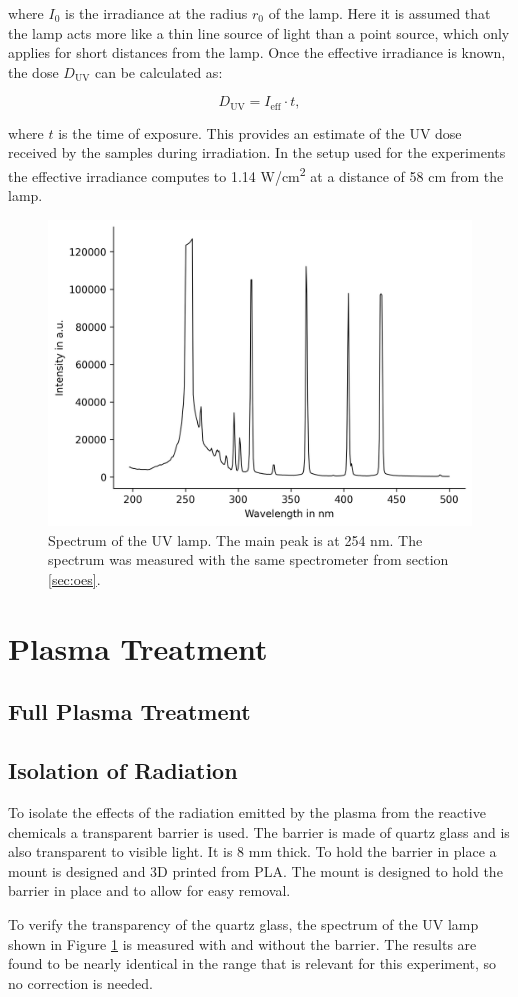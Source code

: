 where $I_0$ is the irradiance at the radius $r_0$ of the lamp. Here it is assumed that the lamp acts more like a thin line source of light than a point source, which only applies for short distances from the lamp. Once the effective irradiance is known, the dose $D_\text{UV}$ can be calculated as:

\begin{equation}
D_\text{UV} = I_\text{eff} \cdot t,
\label{eq:uv_dose}
\end{equation}

where $t$ is the time of exposure. This provides an estimate of the UV dose received by the samples during irradiation. In the setup used for the experiments the effective irradiance computes to 1.14 \textmu W/cm\textsuperscript{2} at a distance of 58 cm from the lamp.


\begin{figure}
    \centering
    \includegraphics[width=.8\textwidth]{images/UV_lamp_no_glass.png}
    \caption[Spectrum of UV lamp]{Spectrum of the UV lamp. The main peak is at 254 nm. The spectrum was measured with the same spectrometer from section \ref{sec:oes}.}
    \label{fig:uv}
\end{figure}

\section{Plasma Treatment}

\subsection{Full Plasma Treatment}

\subsection{Isolation of Radiation}
To isolate the effects of the radiation emitted by the plasma from the reactive chemicals a transparent barrier is used. The barrier is made of quartz glass and is also transparent to visible light. It is 8 mm thick. To hold the barrier in place a mount is designed and 3D printed from PLA. The mount is designed to hold the barrier in place and to allow for easy removal.

To verify the transparency of the quartz glass, the spectrum of the UV lamp shown in Figure \ref{fig:uv} is measured with and without the barrier. The results are found to be nearly identical in the range that is relevant for this experiment, so no correction is needed. 


